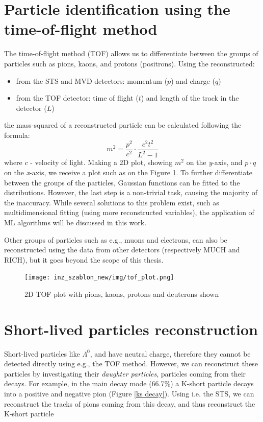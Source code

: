 \pagestyle{fancy}
\section{Particle identification using the time-of-flight method}\thispagestyle{fancy}

The time-of-flight method (TOF) allows us to differentiate between the groups of particles such as pions, kaons, and protons (positrons). Using the reconstructed:
\begin{itemize}
    \item from the STS and MVD detectors: momentum ($p$) and charge ($q$) 
    \item from the TOF detector: time of flight ($t$) and length of the track in the detector ($L$)
\end{itemize} the mass-squared of a reconstructed particle can be calculated following the formula:
\begin{equation}
    m^2 = \frac{p^2}{c^2} \cdot \frac{c^2t^2}{L^2-1}
    \label{msquared}
\end{equation}
where  $c$ - velocity of light. Making a 2D plot, showing $m^2$ on the \emph{y}-axis, and $p\cdot q$ on the \emph{x}-axis, we receive a plot such as on the Figure \ref{tof plot}. To further differentiate between the groups of the particles, Gaussian functions can be fitted to the distributions. However, the last step is a non-trivial task, causing the majority of the inaccuracy. While several solutions to this problem exist, such as multidimensional fitting (using more reconstructed variables), the application of ML algorithms will be discussed in this work. 

Other groups of particles such as e.g., muons and electrons, can also be reconstructed using the data from other detectors (respectively MUCH and RICH), but it goes beyond the scope of this thesis.

\begin{figure}[H]
    \centering
    \texttt{[image: inz\_szablon\_new/img/tof\_plot.png]}
    \caption{2D TOF plot with pions, kaons, protons and deuterons shown \cite{ostrowski}}
    \label{tof plot}
\end{figure}


\section{Short-lived particles reconstruction}

Short-lived particles like $\Lambda^0$, and \PKshort have neutral charge, therefore they cannot be detected directly using e.g., the TOF method. However, we can reconstruct these particles by investigating their \emph{daughter particles}, particles coming from their decays. For example, in the main decay mode (66.7\%) a K-short particle decays into a positive and negative pion (Figure \ref{ks decay}). Using i.e. the STS, we can reconstruct the tracks of pions coming from this decay, and thus reconstruct the K-short particle

